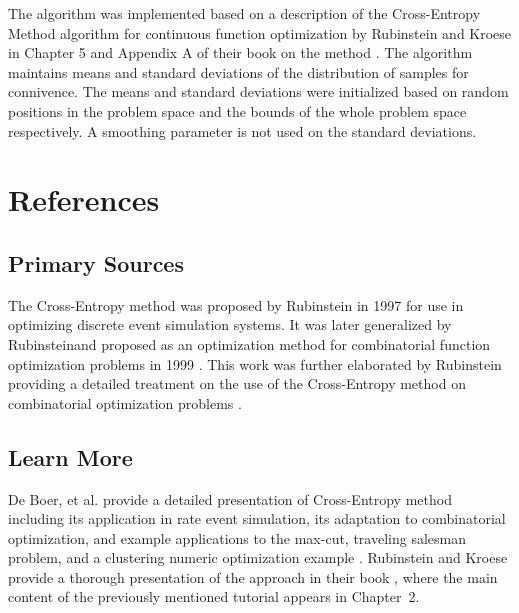 \documentclass[a4paper, 11pt]{article}
\begin{document}
The algorithm was implemented based on a description of the Cross-Entropy Method algorithm for continuous function optimization by Rubinstein and Kroese in Chapter 5 and Appendix A of their book on the method \cite{Rubinstein2004}. The algorithm maintains means and standard deviations  of the distribution of samples for connivence. The means and standard deviations were initialized based on random positions in the problem space and the bounds of the whole problem space respectively. A smoothing parameter is not used on the standard deviations.




\section{References}
\label{sec:references}

% 
% 
\subsection{Primary Sources}
The Cross-Entropy method was proposed by Rubinstein in 1997 \cite{Rubinstein1997} for use in optimizing discrete event simulation systems. It was later generalized by Rubinsteinand proposed as an optimization method for combinatorial function optimization problems in 1999 \cite{Rubinstein1999}.
This work was further elaborated by Rubinstein providing a detailed treatment on the use of the Cross-Entropy method on combinatorial optimization problems \cite{Rubinstein2001}.



% 
% 
\subsection{Learn More}
De Boer, et al. provide a detailed presentation of Cross-Entropy method including its application in rate event simulation, its adaptation to combinatorial optimization, and example applications to the max-cut, traveling salesman problem, and a clustering numeric optimization example \cite{DeBoer2005}.
Rubinstein and Kroese provide a thorough presentation of the approach in their book \cite{Rubinstein2004}, where the main content of the previously mentioned tutorial appears in Chapter~2. 
\end{document}
